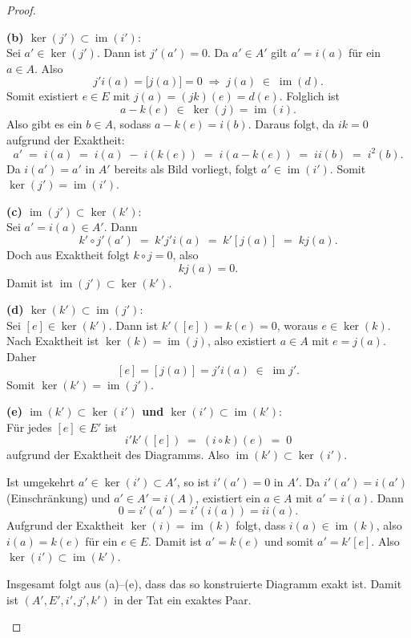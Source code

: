 \documentclass[12pt]{article}
\numberwithin{conj}{section}
\newcommand{\ima}{\operatorname{im}}
\begin{document}
\begin{proof}
\begin{enumerate}[nolistsep]
                \textbf{(b) $\ker(j') \subset \ima(i')$}:\\ Sei $a' \in \ker(j')$. Dann
                ist $j'(a') = 0$. Da $a' \in A'$ gilt $a' = i(a)$ für ein $a \in A$.
                Also
                \[
                    j' i(a)  = \bigl[j(a)\bigr] = 0 \;\Longrightarrow\; j(a) \;\in
                    \; \ima(d).
                \]
                Somit existiert $e \in E$ mit $j(a) = (jk)(e) = d(e)$. Folglich ist
                \[
                    a - k(e) \;\in\; \ker(j) = \ima(i).
                \]
                Also gibt es ein $b \in A$, sodass $a - k(e) = i(b)$. Daraus folgt, da $ik = 0$ aufgrund der Exaktheit:
                \[
                    a' \;=\; i(a) \;=\; i(a) \;-\; i(k(e)) \;=\; i(a - k(e))  \;=\;
                    i i(b)  \;=\; i^{2}(b).
                \]
                Da $i(a') = a'$ in $A'$ bereits als Bild vorliegt, folgt
                $a' \in \ima(i')$. Somit $\ker(j') = \ima(i')$.

                \textbf{(c) $\ima(j') \subset \ker(k')$}:\\ Sei $a' = i(a) \in A'$. Dann
                \[
                     k' \circ j' (a') \;=\; k' j' i(a)   \;=\;
                    k' [j(a)] \;=\; k j(a) .
                \]
                Doch aus Exaktheit folgt $k \circ j = 0$, also
                \[
                    k j(a)  = 0.
                \]
                Damit ist $\ima(j') \subset \ker(k')$.

                \textbf{(d) $\ker(k') \subset \ima(j')$}:\\ Sei $[e] \in \ker(k')$. Dann
                ist $k'( [e] ) = k(e) = 0$, woraus $e \in \ker(k)$. Nach Exaktheit ist
                $\ker(k) = \ima(j)$, also existiert $a \in A$ mit $e = j(a)$. Daher
                \[
                    [e] = [j(a)] = j' i(a)  \;\in\; \ima j' .
                \]
                Somit $\ker(k') = \ima(j')$.

                \textbf{(e) $\ima(k') \subset \ker(i')$ und $\ker(i') \subset \ima(k')$}:\\
                Für jedes $[e] \in E'$ ist
                \[
                    i' k'( [e] )  \;=\; (i \circ k)(e) \;=\; 0
                \]
                aufgrund der Exaktheit des Diagramms. Also $\ima(k') \subset \ker(i')$.

                Ist umgekehrt $a' \in \ker(i') \subset A'$, so ist $i'(a') = 0$ in $A'$.
                Da $i'(a') = i(a')$ (Einschränkung) und $a' \in A' = i(A)$, existiert ein
                $a \in A$ mit $a' = i(a)$. Dann
                \[
                    0 = i'(a') = i'(i(a)) = i i(a) .
                \]
                Aufgrund der Exaktheit $\ker(i) = \ima(k)$ folgt, dass $i(a) \in \ima(k)$,
                also $i(a) = k(e)$ für ein $e \in E$. Damit ist $a' = k(e)$ und somit $a'
                = k' [e] $. Also $\ker(i') \subset \ima(k')$.

                Insgesamt folgt aus (a)--(e), dass das so konstruierte Diagramm exakt
                ist. Damit ist $(A', E', i', j', k')$ in der Tat ein exaktes Paar.
        \end{enumerate}
    \end{proof}
\end{document}
